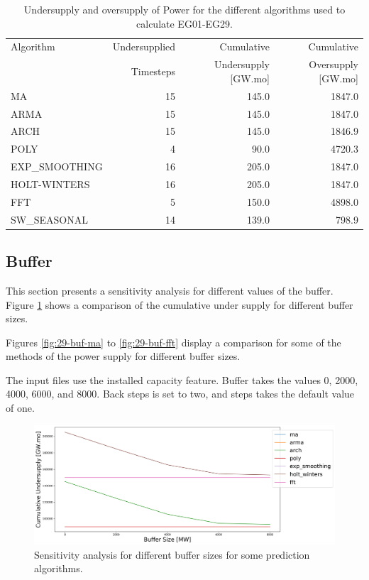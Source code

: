 \documentclass[11pt]{article}
\begin{document}
\begin{table}[H]
	\centering
	\caption{Undersupply and oversupply of Power for the different algorithms used to calculate EG01-EG29.}
	\label{tab:29-power}
	\begin{tabularx}{\textwidth}{lRRR}
		\hline
		Algorithm & Undersupplied & Cumulative  & Cumulative \\
		& Timesteps     & Undersupply [GW.mo]  & Oversupply [GW.mo] \\ \hline
		MA        & 15 	& 145.0 & 1847.0 \\ 
		ARMA      & 15 	& 145.0 & 1847.0 \\ 
		ARCH      & 15 	& 145.0 & 1846.9 \\ 
		POLY      &  4 	& 90.0 & 4720.3 \\ 
		EXP\_SMOOTHING 	& 16 & 205.0 & 1847.0 \\ 
		HOLT-WINTERS  	& 16 & 205.0 & 1847.0 \\ 
		FFT       &  5	& 150.0	& 4898.0 \\ 
		SW\_SEASONAL    & 14 & 139.0 & 798.9 \\ \hline
	\end{tabularx}
\end{table}

\subsection{Buffer}

This section presents a sensitivity analysis for different values of the buffer. Figure \ref{fig:29-buff} shows a comparison of the cumulative under supply for different buffer sizes.

Figures \ref{fig:29-buf-ma} to \ref{fig:29-buf-fft} display a comparison for some of the methods of the power supply for different buffer sizes.

The input files use the installed capacity feature. Buffer takes the values 0, 2000, 4000, 6000, and 8000. Back steps is set to two, and steps takes the default value of one.

\begin{figure}[H]
	\centering
	\includegraphics[width=\textwidth]{29-figures/29-sens-buffer.png} 
	\hfill
	\caption{Sensitivity analysis for different buffer sizes for some prediction algorithms.}
	\label{fig:29-buff}
\end{figure}
\end{document}
